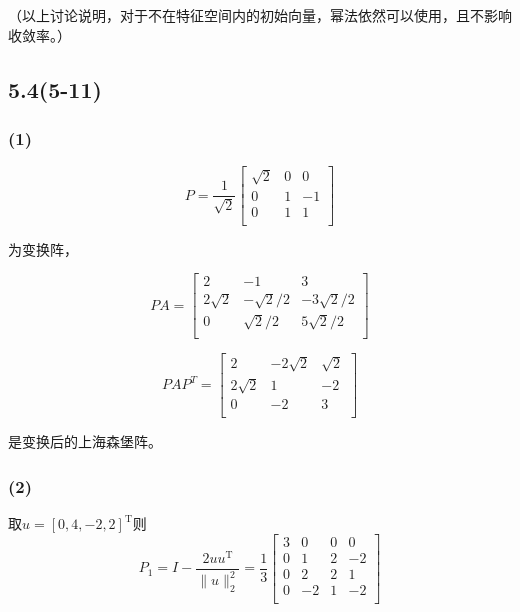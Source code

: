 \documentclass[UTF8,zihao=5]{ctexart}
\newcommand{\trans}[0]{^\mathrm{T}}
\begin{document}
（以上讨论说明，对于不在特征空间内的初始向量，幂法依然可以使用，且不影响收敛率。）

\subsection*{5.4(5-11)}

\subsubsection*{(1)}

$$
    P=\frac{1}{\sqrt{2}}\begin{bmatrix}
        \sqrt{2} & 0 & 0  \\
        0        & 1 & -1 \\
        0        & 1 & 1  \\
    \end{bmatrix}
$$

为变换阵，

$$
    PA=\begin{bmatrix}
        2         & -1          & 3            \\
        2\sqrt{2} & -\sqrt{2}/2 & -3\sqrt{2}/2 \\
        0         & \sqrt{2}/2  & 5\sqrt{2}/2  \\
    \end{bmatrix}
$$

$$
    PAP^T=\begin{bmatrix}
        2         & -2\sqrt{2} & \sqrt{2} \\
        2\sqrt{2} & 1          & -2       \\
        0         & -2         & 3        \\
    \end{bmatrix}
$$

是变换后的上海森堡阵。

\subsubsection*{(2)}
取$u=[0,4,-2,2]\trans$则
$$
    P_1=I-\frac{2uu\trans}{\|u\|^2_2}=
    \frac{1}{3}
    \begin{bmatrix}
        3 & 0  & 0 & 0  \\
        0 & 1  & 2 & -2 \\
        0 & 2  & 2 & 1  \\
        0 & -2 & 1 & -2 \\
    \end{bmatrix}
$$
\end{document}
